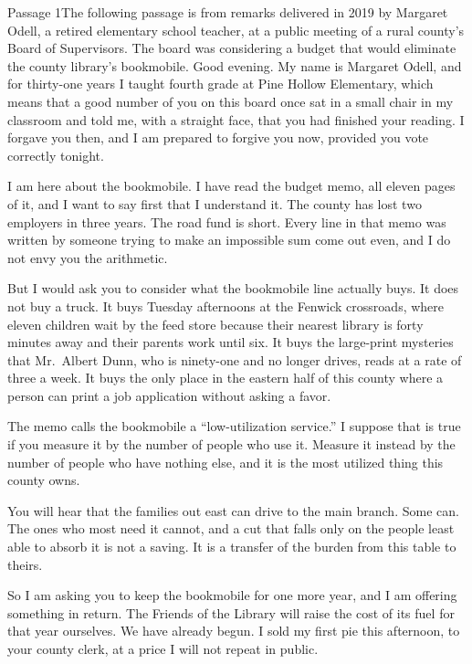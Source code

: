 \documentclass[11pt]{article}
\begin{document}
\begin{passage}{Passage 1}{The following passage is from remarks delivered in 2019 by Margaret Odell, a retired elementary school teacher, at a public meeting of a rural county's Board of Supervisors. The board was considering a budget that would eliminate the county library's bookmobile.}
 Good evening. My name is Margaret Odell, and for thirty-one years I taught fourth grade at Pine Hollow Elementary, which means that a good number of you on this board once sat in a small chair in my classroom and told me, with a straight face, that you had finished your reading. I forgave you then, and I am prepared to forgive you now, provided you vote correctly tonight.

 I am here about the bookmobile. I have read the budget memo, all eleven pages of it, and I want to say first that I understand it. The county has lost two employers in three years. The road fund is short. Every line in that memo was written by someone trying to make an impossible sum come out even, and I do not envy you the arithmetic.

 But I would ask you to consider what the bookmobile line actually buys. It does not buy a truck. It buys Tuesday afternoons at the Fenwick crossroads, where eleven children wait by the feed store because their nearest library is forty minutes away and their parents work until six. It buys the large-print mysteries that Mr.\ Albert Dunn, who is ninety-one and no longer drives, reads at a rate of three a week. It buys the only place in the eastern half of this county where a person can print a job application without asking a favor.

 The memo calls the bookmobile a ``low-utilization service.'' I suppose that is true if you measure it by the number of people who use it. Measure it instead by the number of people who have nothing else, and it is the most utilized thing this county owns.

 You will hear that the families out east can drive to the main branch. Some can. The ones who most need it cannot, and a cut that falls only on the people least able to absorb it is not a saving. It is a transfer of the burden from this table to theirs.

 So I am asking you to keep the bookmobile for one more year, and I am offering something in return. The Friends of the Library will raise the cost of its fuel for that year ourselves. We have already begun. I sold my first pie this afternoon, to your county clerk, at a price I will not repeat in public.
\end{passage}
\end{document}

